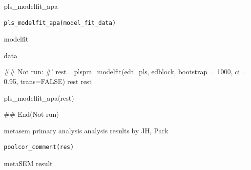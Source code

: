 \documentclass[a4paper]{book}
\begin{document}
%
\begin{Description}
pls\_modelfit\_apa
\end{Description}
%
\begin{Usage}
\begin{verbatim}
pls_modelfit_apa(model_fit_data)
\end{verbatim}
\end{Usage}
%
\begin{Arguments}
\begin{ldescription}
\item[\code{model\_fit\_data}] modelfit
\end{ldescription}
\end{Arguments}
%
\begin{Value}
data
\end{Value}
%
\begin{Examples}
\begin{ExampleCode}

\#\# Not run: 
#'
rest= plspm_modelfit(edt_pls, edblock, bootstrap = 1000, ci = 0.95, trans=FALSE)
rest
rest%

pls_modelfit_apa(rest)


## End(Not run)
\end{ExampleCode}
\end{Examples}
%
\begin{Description}
metasem primary analysis analysis results by JH, Park
\end{Description}
%
\begin{Usage}
\begin{verbatim}
poolcor_comment(res)
\end{verbatim}
\end{Usage}
%
\begin{Arguments}
\begin{ldescription}
\item[\code{res}] metaSEM result
\end{ldescription}
\end{Arguments}
%
\end{document}
